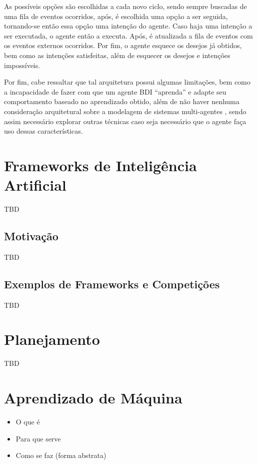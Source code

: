 As possíveis opções são escolhidas a cada novo ciclo, sendo sempre buscadas de
uma fila de eventos ocorridos, após, é escolhida uma opção a ser seguida,
tornando-se então essa opção uma intenção do agente. Caso haja uma intenção a
ser executada, o agente então a executa. Após, é atualizada a fila de eventos
com os eventos externos ocorridos. Por fim, o agente esquece os desejos já
obtidos, bem como as intenções satisfeitas, além de esquecer os desejos e
intenções impossíveis.

Por fim, cabe ressaltar que tal arquitetura possui algumas limitações, bem como
a incapacidade de fazer com que um agente BDI ``aprenda'' e adapte seu
comportamento baseado no aprendizado obtido, além de não haver nenhuma
consideração arquitetural sobre a modelagem de sistemas multi-agentes
\cite{BDIMODELOFAGENCY}, sendo assim necessário explorar outras técnicas caso
seja necessário que o agente faça uso dessas características.

\section{Frameworks de Inteligência Artificial}

TBD

\subsection{Motivação}

TBD

\subsection{Exemplos de Frameworks e Competições}

TBD

\section{Planejamento}

TBD

\section{Aprendizado de Máquina}

\begin{itemize} \item O que é \item Para que serve \item Como se faz (forma
abstrata) \end{itemize}

